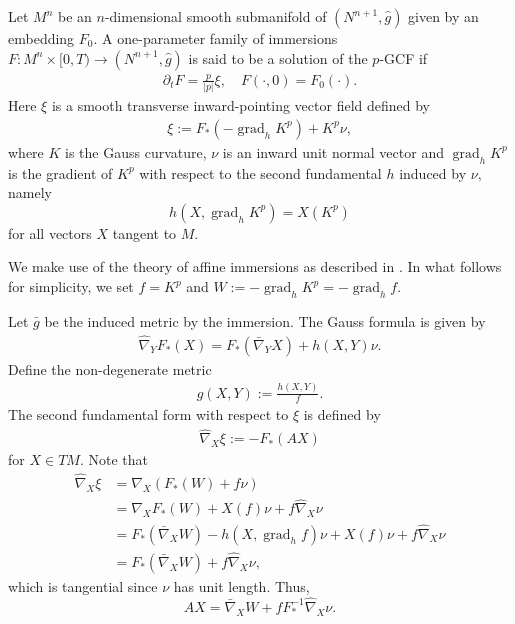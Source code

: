 \documentclass{amsart}
\theoremstyle{definition}
\theoremstyle{remark}
\numberwithin{equation}{section}
\begin{document}
\title[]
 {}

\curraddr{}
\email{}
\date{\today}

\dedicatory{}
\subjclass[2010]{}
\keywords{}

\begin{abstract}

\end{abstract}

\maketitle
Let $M^n$ be an $n$-dimensional smooth submanifold of $(N^{n+1},\hat{g})$ given by an embedding $F_0.$ A one-parameter family of immersions $F\colon M^n\times [0,T)\to (N^{n+1},\hat{g})$ is said to be a solution of the $ p $-GCF if
\begin{align}
\partial_tF=\frac{p}{|p|}\xi,\quad F(\cdot,0)=F_0(\cdot).
\end{align}
Here $\xi $ is a smooth transverse inward-pointing vector field defined by
\begin{align}
\xi:=F_{\ast}(-\operatorname{grad}_hK^p)+ K ^{ p }\nu,
\end{align}
where $ K $ is the Gauss curvature, $\nu$ is an inward unit normal vector and $\operatorname{grad}_hK^{p}$ is the gradient of $K^{p}$ with respect to the second fundamental $h$ induced by $\nu,$ namely
\[
h(X, \operatorname{grad}_h K^p) = X(K^p)
\]
for all vectors $X$ tangent to $M$.

We make use of the theory of affine immersions as described in \cite{MR1311248}. In what follows for simplicity, we set $ f = K ^{ p }$ and $W:=-\operatorname{grad}_hK^{p} = - \operatorname{grad}_h f.$

Let $\bar{g}$ be the induced metric by the immersion. The Gauss formula is given by
\begin{align}\label{gauss equ}
\hat{\nabla}_YF_{\ast}(X)=F_{\ast}(\bar{\nabla}_YX)+h(X,Y)\nu.
\end{align}
Define the non-degenerate metric
\begin{align}
g(X,Y):=\frac{h(X,Y)}{ f }.
\end{align}
The second fundamental form with respect to $\xi$ is defined by
\begin{align}
\hat{\nabla}_X\xi:=-F_{\ast}(AX)
\end{align}
for $X\in TM$. Note that
\begin{align*}
\hat{\nabla}_X \xi &= \hat{\nabla}_X (F_{\ast}(W) + f \nu) \\
&= \hat{\nabla}_X F_{\ast}(W) + X(f)\nu + f \hat{\nabla}_X \nu \\
&= F_{\ast}(\bar{\nabla}_X W) - h(X, \operatorname{grad}_h f) \nu + X(f) \nu + f \hat{\nabla}_X \nu \\
&= F_{\ast} (\bar{\nabla}_X W) + f \hat{\nabla}_X \nu,
\end{align*}
which is tangential since $\nu$ has unit length. Thus,
\[
AX = \bar{\nabla}_X W + f F_{\ast}^{-1} \hat{\nabla}_X \nu.
\]
\end{document}
